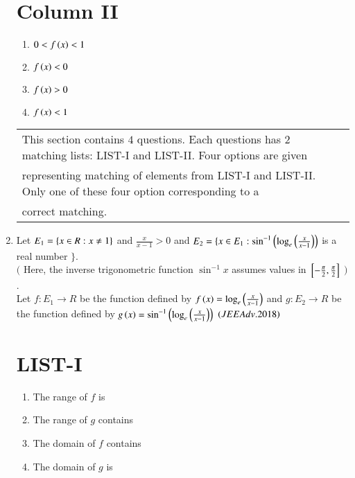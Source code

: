 \documentclass[journal,12pt,onecolumn,article]{IEEEtran}
\theoremstyle{remark}
\begin{document}
\begin{enumerate}
\begin{multicols}{2}
						\section*{ Column II}
						\begin{enumerate}[label=(\alph*) ,start=16]
							\item $0<f\left(x\right)<1$
							\item $f\left(x\right)<0$
							\item $f\left(x\right)>0$
							\item $f\left(x\right)<1$
						\end{enumerate}
					\end{multicols}
         \begin{tabular}{l|l}
\\
\hline
This section contains $4$ questions. Each questions has $2$ matching lists: LIST-I and LIST-II. Four options are given\\representing matching of elements from LIST-I and LIST-II. Only one of these four option corresponding to a\\correct matching.
\\
\hline
\end{tabular}
			 \item Let $E_1=\left\{x\in R:x\neq1\right\}$ and $\frac{x}{x-1}>0$ and $E_2=\{x\in E_1:\sin^{-1}\left(\log_e\left(\frac{x}{x-1}\right)\right)$ is a real number $\}$.\\ 
				 $($ Here, the inverse trigonometric function $\sin^{-1}x$ assumes values in ${}\left[-\frac{\pi}{2},\frac{\pi}{2}\right]$ $)$.\\
			Let $f:E_1\to R$ be the function defined by $f\left(x\right)=\log_e\left(\frac{x}{x-1}\right)$ and $g:E_2\to R$ be the function defined by $g\left(x\right)=\sin^{-1}\left(\log_e\left(\frac{x}{x-1}\right)\right)$
			\hfill${\left(JEE Adv.2018\right)}$
\begin{multicols}{2}
	\section*{LIST-I}
	\begin{enumerate}[label=(\Alph*), start=16]
	\item The range of $f$ is
	\item The range of $g$ contains
	\item The domain of $f$ contains
	\item The domain of $g$ is 
\end{enumerate}
\columnbreak

\end{multicols}
\end{enumerate}
\end{document}
